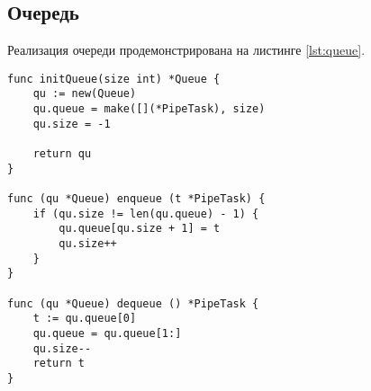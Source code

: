 \subsection{Очередь}
Реализация очереди продемонстрирована на листинге \ref{lst:queue}.
\begin{lstlisting}[label=lst:queue,caption=Очередь]
func initQueue(size int) *Queue {
	qu := new(Queue)
	qu.queue = make([](*PipeTask), size)
	qu.size = -1
	
	return qu
}

func (qu *Queue) enqueue (t *PipeTask) {
	if (qu.size != len(qu.queue) - 1) {
		qu.queue[qu.size + 1] = t
		qu.size++
	}
}

func (qu *Queue) dequeue () *PipeTask {
	t := qu.queue[0]
	qu.queue = qu.queue[1:]
	qu.size--
	return t
}
\end{lstlisting}
